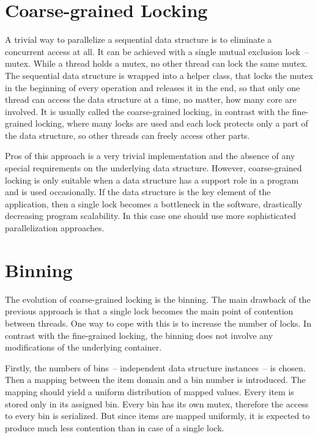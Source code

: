 \section{Coarse-grained Locking}

A trivial way to parallelize a sequential data structure is to eliminate a concurrent access at all. It can be achieved with a single mutual exclusion lock~-- mutex. While a thread holds a mutex, no other thread can lock the same mutex. The sequential data structure is wrapped into a helper class, that locks the mutex in the beginning of every operation and releases it in the end, so that only one thread can access the data structure at a time, no matter, how many core are involved. It is usually called the coarse-grained locking, in contrast with the fine-grained locking, where many locks are used and each lock protects only a part of the data structure, so other threads can freely access other parts.

Pros of this approach is a very trivial implementation and the absence of any special requirements on the underlying data structure. However, coarse-grained locking is only suitable when a data structure has a support role in a program and is used occasionally. If the data structure is the key element of the application, then a single lock becomes a bottleneck in the software, drastically decreasing program scalability. In this case one should use more sophisticated parallelization approaches.

\section{Binning}

The evolution of coarse-grained locking is the binning. The main drawback of the previous approach is that a single lock becomes the main point of contention between threads. One way to cope with this is to increase the number of locks. In contrast with the fine-grained locking, the binning does not involve any modifications of the underlying container.

Firstly, the numbers of bins~-- independent data structure instances~-- is chosen. Then a mapping between the item domain and a bin number is introduced. The mapping should yield a uniform distribution of mapped values. Every item is stored only in its assigned bin. Every bin has its own mutex, therefore the access to every bin is serialized. But since items are mapped uniformly, it is expected to produce much less contention than in case of a single lock.

